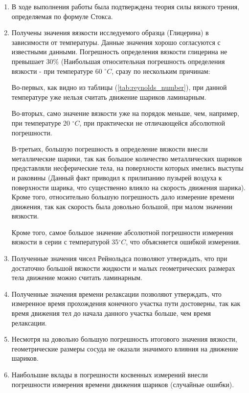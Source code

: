 \documentclass[12pt,a4paper]{article}
\begin{document}
\begin{enumerate}
	\item В ходе выполнения работы была подтверждена теория силы вязкого трения, определяемая по формуле Стокса.
	\item Получены значения вязкости исследуемого образца (Глицерина) в зависимости от температуры. Данные значения хорошо согласуются с известными данными. Погрешность определения вязкости глицерина не превышает 30$\%$ (Наибольшая относительная погрешность определения вязкости - при температуре 60 $^\circ C$, сразу по нескольким причинам:
	
	Во-первых, как видно из таблицы (\ref{tab:reynolds_number}), при данной температуре уже нельзя считать движение шариков ламинарным.
	
	Во-вторых, само значение вязкости уже на порядок меньше, чем, например, при температуре 20 $^\circ C$, при практически не отличающейся абсолютной погрешности.
	
	В-третьих, большую погрешность в определение вязкости внесли металлические шарики, так как большое количество металлических шариков представляли несферические тела, на поверхности которых имелись выступы и раковины (Данный факт приводил к прилипанию пузырей воздуха к поверхности шарика, что существенно влияло на скорость движения шарика). Кроме того, относительно большую погрешность дало измерение времени движения, так как скорость была довольно большой, при малом значении вязкости.
	
	Кроме того, самое большое значение абсолютной погрешности измерения вязкости в серии с температурой 35$^\circ C$, что объясняется ошибкой измерения.
	\item Полученные значения чисел Рейнольдса позволяют утверждать, что при достаточно большой вязкости жидкости и малых геометрических размерах тела движение можно считать ламинарным.
	\item Полученные значения времени релаксации позволяют утверждать, что измеренное время прохождения конечного участка пути достоверны, так как время движения тел до начала данного участка больше, чем время релаксации.
	\item Несмотря на довольно большую погрешность итогового значения вязкости, геометрические размеры сосуда не оказали значимого влияния на движение шариков.
	\item Наибольшие вклады в погрешности косвенных измерений внесли погрешности измерения времени движения шариков (случайные ошибки).
\end{enumerate}
\end{document}
